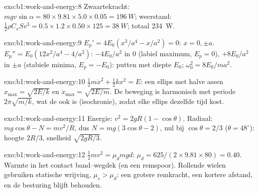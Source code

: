 \begin{solution}{exo:b1:work-and-energy:8}
Zwaartekracht: $mgv\sin\alpha = 80 \times 9.81 \times 5.0 \times 0.05 = \qty{196}{W}$;
weerstand: $\tfrac12\rho C_xSv^3 = 0.5 \times 1.2 \times 0.50 \times 125 =
\qty{38}{W}$; totaal \qty{234}{W}.
\end{solution}

\begin{solution}{exo:b1:work-and-energy:9}
$E_p' = 4E_0(x^3/a^4 - x/a^2) = 0$: $x = 0, \pm a$. $E_p'' = E_0(12x^2/a^4 -
4/a^2)$: $-4E_0/a^2$ in $0$ (labiel maximum, $E_p = 0$), $+8E_0/a^2$
in $\pm a$ (stabiele minima, $E_p = -E_0$): putten met diepte $E_0$;
$\omega_0^2 = 8E_0/ma^2$.
\end{solution}

\begin{solution}{exo:b1:work-and-energy:10}
$\tfrac12 m\dot x^2 + \tfrac12 kx^2 = E$: een ellips met halve assen $x_{\max}
= \sqrt{2E/k}$ en $\dot x_{\max} = \sqrt{2E/m}$. De beweging is harmonisch
met periode $2\pi\sqrt{m/k}$, wat de  ook is (isochronie), zodat
elke ellips dezelfde tijd kost.
\end{solution}

\begin{solution}{exo:b1:work-and-energy:11}
Energie: $v^2 = 2gR(1 - \cos\theta)$. Radiaal: $mg\cos\theta - N = mv^2/R$,
dus $N = mg(3\cos\theta - 2)$, nul bij $\cos\theta = 2/3$ ($\theta =
48^\circ$): hoogte $2R/3$, snelheid $\sqrt{2gR/3}$.
\end{solution}

\begin{solution}{exo:b1:work-and-energy:12}
$\tfrac12 mv^2 = \mu_dmgd$: $\mu_d = 625/(2 \times 9.81 \times 80) = 0.40$.
Warmte in het contact band--wegdek (en een remspoor). Rollende wielen gebruiken
statische wrijving, $\mu_s > \mu_d$: een grotere remkracht, een kortere
afstand, en de besturing blijft behouden.
\end{solution}

